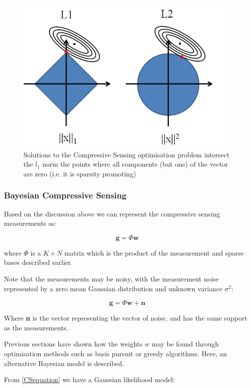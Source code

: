\documentclass[conference]{IEEEtran}
\begin{document}
\begin{figure}[h]
\centering
\includegraphics[height = 7 cm]{l1l2.jpg}
\caption{Solutions to the Compressive Sensing optimisation problem intersect the \(l_1\) norm the points where all components (but one) of the vector are zero (i.e. it is sparsity promoting) \cite{Tibshirani1996}}
\label{l1l2}
\end{figure}

\subsubsection{Bayesian Compressive Sensing}
Based on the discussion above we can represent the compressive sensing measurements as: 

\begin{equation}
\textbf{g} = \Phi	\textbf{w}
\end{equation}

where \(\Phi\) is a \(K \times	N\) matrix which is the product of the measurement and sparse bases described earlier.

Note that the measurements may be noisy, with the measurement noise represented by a zero mean Gaussian distribution and unknown variance \( \sigma^2 \):

\begin{equation}
\textbf{g} = \Phi \textbf{w} + \textbf{n}
\end{equation}
\label{CSequation}

Where \textbf{n} is the vector representing the vector of noise, and has the same support as the measurements. 

Previous sections have shown how the weights \(w\) may be found through optimisation methods such as basis pursuit or greedy algorithms. Here, an alternative Bayesian model is described.

From \ref{CSequation} we have a Gaussian likelihood model: 
\end{document}
